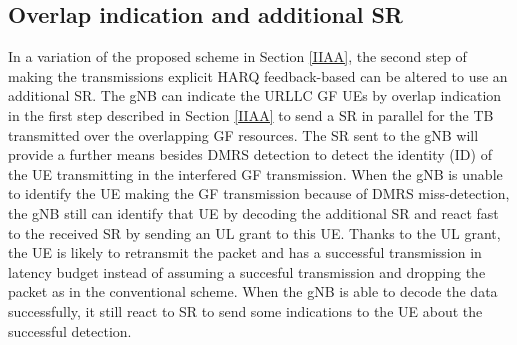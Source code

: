 \documentclass[conference]{IEEEtran}
\begin{document}

\subsection{Overlap indication and additional SR}\label{IIBB}
In a variation of the proposed scheme in Section \ref{IIAA}, the second step of making the transmissions explicit HARQ feedback-based can be altered to use an additional SR. The gNB can indicate the URLLC GF UEs by overlap indication in the first step described in Section \ref{IIAA} to send a SR in parallel for the TB transmitted over the overlapping GF resources. The SR sent to the gNB will provide a further means besides DMRS detection to detect the identity (ID) of the UE transmitting in the interfered GF transmission. When the gNB is unable to identify the UE making the GF transmission because of DMRS miss-detection, the gNB still can identify that UE by decoding the additional SR and react fast to the received SR by sending an UL grant to this UE. Thanks to the UL grant, the UE is likely to retransmit the packet and has a successful transmission in latency budget instead of assuming a succesful transmission and dropping the packet as in the conventional scheme. When the gNB is able to decode the data successfully, it still react to SR to send some indications to the UE about the successful detection.  
\end{document}
